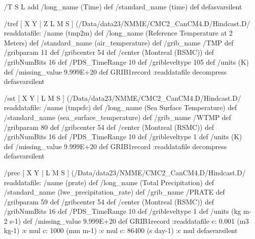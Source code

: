 \begin{ingrid}
%

/T { S L add
/long_name (Time) def
/standard_name (time) def } defasvarsilent

/tref {
[ X Y | Z L M S ] (/Data/data23/NMME/CMC2_CanCM4.D/Hindcast.D/%
readdatafile: 
/name (tmp2m) def
/long_name (Reference Temperature at 2 Meters) def
/standard_name (air_temperature) def
/grib_name /TMP def
/gribparam 11 def
/gribcenter 54 def
/center (Montreal (RSMC)) def
/gribNumBits 16 def
/PDS_TimeRange 10 def
/gribleveltype 105 def
/units (K) def
/missing_value 9.999E+20 def
GRIB1record
:readdatafile
decompress
} defasvarsilent

/sst {
[ X Y | L M S ] (/Data/data23/NMME/CMC2_CanCM4.D/Hindcast.D/%
readdatafile: 
/name (tmpsfc) def
/long_name (Sea Surface Temperature) def
/standard_name (sea_surface_temperature) def
/grib_name /WTMP def
/gribparam 80 def
/gribcenter 54 def
/center (Montreal (RSMC)) def
/gribNumBits 16 def
/PDS_TimeRange 10 def
/gribleveltype 1 def
/units (K) def
/missing_value 9.999E+20 def
GRIB1record
:readdatafile decompress
} defasvarsilent

/prec {
[ X Y | L M S ] (/Data/data23/NMME/CMC2_CanCM4.D/Hindcast.D/%
readdatafile: 
/name (prate) def
/long_name (Total Precipitation) def
/standard_name (lwe_precipitation_rate) def
/grib_name /PRATE def
/gribparam 59 def
/gribcenter 54 def
/center (Montreal (RSMC)) def
/gribNumBits 16 def
/PDS_TimeRange 10 def
/gribleveltype 1 def
/units (kg m-2 s-1) def
/missing_value 9.999E+20 def
GRIB1record 
:readdatafile
  c:
   0.001 (m3 kg-1) :c
   mul
  c:
   1000 (mm m-1) :c
   mul
  c:
   86400 (s day-1) :c
   mul
} defasvarsilent


\end{ingrid}

